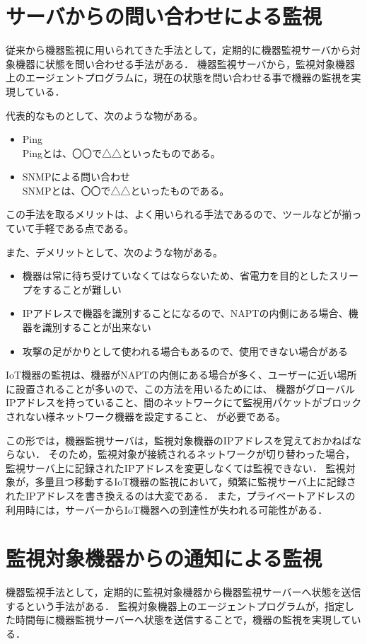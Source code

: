 \section{サーバからの問い合わせによる監視}
	従来から機器監視に用いられてきた手法として，定期的に機器監視サーバから対象機器に状態を問い合わせる手法がある．
	機器監視サーバから，監視対象機器上のエージェントプログラムに，現在の状態を問い合わせる事で機器の監視を実現している．
	\medskip

	代表的なものとして、次のような物がある。
	\begin{itemize}
		\item Ping\\
			Pingとは、〇〇で△△といったものである。
		\item SNMPによる問い合わせ\\
			SNMPとは、〇〇で△△といったものである。
	\end{itemize}
	
	この手法を取るメリットは、よく用いられる手法であるので、ツールなどが揃っていて手軽である点である。
	
	また、デメリットとして、次のような物がある。
	\begin{itemize}
		\item 機器は常に待ち受けていなくてはならないため、省電力を目的としたスリープをすることが難しい
		\item IPアドレスで機器を識別することになるので、NAPTの内側にある場合、機器を識別することが出来ない
		\item 攻撃の足がかりとして使われる場合もあるので、使用できない場合がある
	\end{itemize}

	IoT機器の監視は、機器がNAPTの内側にある場合が多く、ユーザーに近い場所に設置されることが多いので、この方法を用いるためには、
	機器がグローバルIPアドレスを持っていること、間のネットワークにて監視用パケットがブロックされない様ネットワーク機器を設定すること、
	が必要である。

	この形では，機器監視サーバは，監視対象機器のIPアドレスを覚えておかねばならない．
	そのため，監視対象が接続されるネットワークが切り替わった場合，監視サーバ上に記録されたIPアドレスを変更しなくては監視できない．
	監視対象が，多量且つ移動するIoT機器の監視において，頻繁に監視サーバ上に記録されたIPアドレスを書き換えるのは大変である．
	また，プライベートアドレスの利用時には，サーバーからIoT機器への到達性が失われる可能性がある．

\section{監視対象機器からの通知による監視}
	機器監視手法として，定期的に監視対象機器から機器監視サーバーへ状態を送信するという手法がある．
	監視対象機器上のエージェントプログラムが，指定した時間毎に機器監視サーバーへ状態を送信することで，機器の監視を実現している．
	\medskip
	
